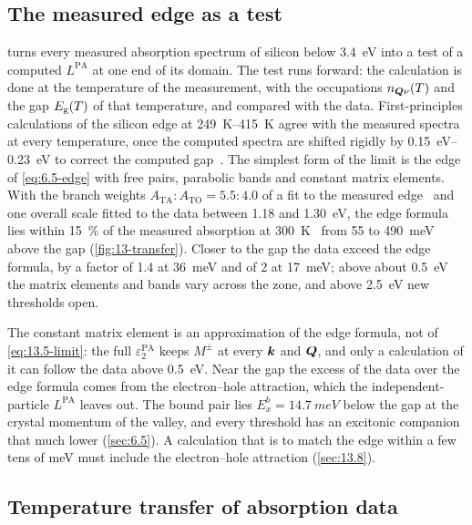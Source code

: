 \subsection{The measured edge as a test}

 turns every measured absorption spectrum of silicon below \SI{3.4}{eV} into a test of a computed $L^{\mathrm{PA}}$ at one end of its domain. The test runs forward: the calculation is done at the temperature of the measurement, with the occupations $n_{\bm{Q}\nu}(T)$ and the gap $E_{\mathrm{g}}(T)$ of that temperature, and compared with the data. First-principles calculations of the silicon edge at \SIrange{249}{415}{K} agree with the measured spectra at every temperature, once the computed spectra are shifted rigidly by \SIrange{0.15}{0.23}{eV} to correct the computed gap~\cite{noffsinger2012phonon}. The simplest form of the limit is the edge of \cref{eq:6.5-edge} with free pairs, parabolic bands and constant matrix elements. With the branch weights $A_{\mathrm{TA}}:A_{\mathrm{TO}} = 5.5:4.0$ of a fit to the measured edge~\cite{rajkanan1979absorption,stanford2021photoelectric} and one overall scale fitted to the data between 1.18 and \SI{1.30}{eV}, the edge formula lies within \SI{15}{\percent} of the measured absorption at \SI{300}{K}~\cite{franta2017temperature} from 55 to \SI{490}{meV} above the gap (\cref{fig:13-transfer}). Closer to the gap the data exceed the edge formula, by a factor of 1.4 at \SI{36}{meV} and of 2 at \SI{17}{meV}; above about \SI{0.5}{eV} the matrix elements and bands vary across the zone, and above \SI{2.5}{eV} new thresholds open.

The constant matrix element is an approximation of the edge formula, not of \cref{eq:13.5-limit}: the full $\varepsilon_2^{\mathrm{PA}}$ keeps $M^\pm$ at every $\bm{k}$ and $\bm{Q}$, and only a calculation of it can follow the data above \SI{0.5}{eV}. Near the gap the excess of the data over the edge formula comes from the electron--hole attraction, which the independent-particle $L^{\mathrm{PA}}$ leaves out. The bound pair lies $E_x^b = \SI{14.7}{meV}$ below the gap at the crystal momentum of the valley, and every threshold has an excitonic companion that much lower (\cref{sec:6.5}). A calculation that is to match the edge within a few tens of meV must include the electron--hole attraction (\cref{sec:13.8}).

\subsection{Temperature transfer of absorption data}

